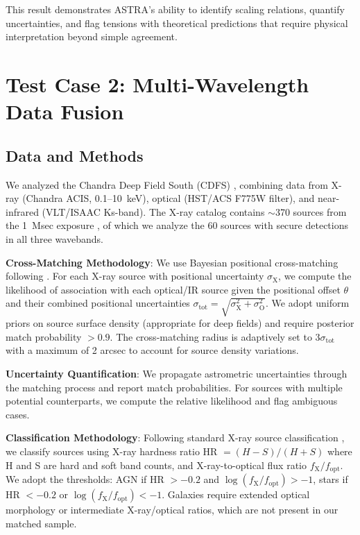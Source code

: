 \documentclass[usenatbib]{rasti}
\begin{document}
This result demonstrates ASTRA's ability to identify scaling relations, quantify uncertainties, and flag tensions with theoretical predictions that require physical interpretation beyond simple agreement.

\section{Test Case 2: Multi-Wavelength Data Fusion}

\subsection{Data and Methods}

We analyzed the Chandra Deep Field South (CDFS) \cite{giacconi2001}, combining data from X-ray (Chandra ACIS, 0.1--10~keV), optical (HST/ACS F775W filter), and near-infrared (VLT/ISAAC Ks-band). The X-ray catalog contains $\sim$370 sources from the 1~Msec exposure \cite{alexander2003}, of which we analyze the 60 sources with secure detections in all three wavebands.

\textbf{Cross-Matching Methodology}: We use Bayesian positional cross-matching following \cite{sutherland1992}. For each X-ray source with positional uncertainty $\sigma_{\mathrm{X}}$, we compute the likelihood of association with each optical/IR source given the positional offset $\theta$ and their combined positional uncertainties $\sigma_{\mathrm{tot}} = \sqrt{\sigma_{\mathrm{X}}^2 + \sigma_{\mathrm{O}}^2}$. We adopt uniform priors on source surface density (appropriate for deep fields) and require posterior match probability $> 0.9$. The cross-matching radius is adaptively set to $3\sigma_{\mathrm{tot}}$ with a maximum of 2 arcsec to account for source density variations.

\textbf{Uncertainty Quantification}: We propagate astrometric uncertainties through the matching process and report match probabilities. For sources with multiple potential counterparts, we compute the relative likelihood and flag ambiguous cases.

\textbf{Classification Methodology}: Following standard X-ray source classification \cite{hornschemeier2001,bauer2004}, we classify sources using X-ray hardness ratio HR $= (H-S)/(H+S)$ where H and S are hard and soft band counts, and X-ray-to-optical flux ratio $f_{\mathrm{X}}/f_{\mathrm{opt}}$. We adopt the thresholds: AGN if HR $> -0.2$ and $\log(f_{\mathrm{X}}/f_{\mathrm{opt}}) > -1$, stars if HR $< -0.2$ or $\log(f_{\mathrm{X}}/f_{\mathrm{opt}}) < -1$. Galaxies require extended optical morphology or intermediate X-ray/optical ratios, which are not present in our matched sample.
\end{document}

